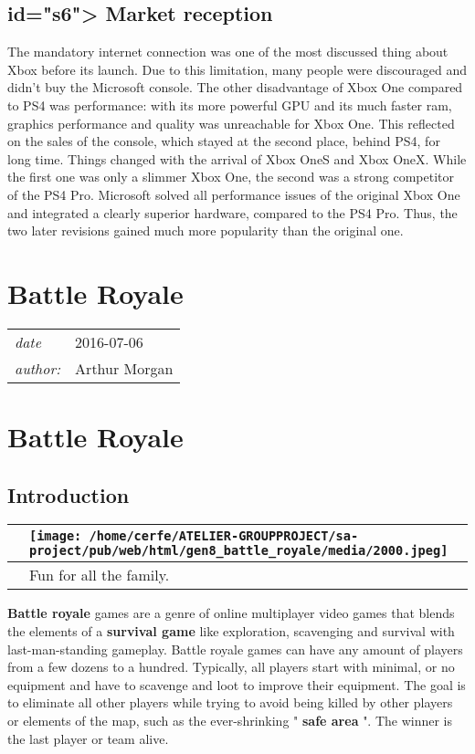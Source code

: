 \documentclass[a4paper,10pt]{book}
\newcommand{\pageHeader}[4]{
    \section{#1}
    \vspace{-0.3cm}
    \begin{table}[h!]
     \begin{tabular}{ll}
        \hline
        \textit{date} & #2 \\
        \textit{author: } & #3\\
        \hline
     \end{tabular}
    \end{table}
    \vspace{-0.3cm}
}
\begin{document}
 \subsection{ id="s6"> Market reception  }
  The mandatory internet connection was one of the most discussed thing about Xbox before its launch. Due to this limitation, many people were discouraged and didn't buy the Microsoft console. The other disadvantage of Xbox One compared to PS4 was performance: with its more powerful GPU and its much faster ram, graphics performance and quality was unreachable for Xbox One. This reflected on the sales of the console, which stayed at the second place, behind PS4, for long time.  
  Things changed with the arrival of Xbox OneS and Xbox OneX. While the first one was only a slimmer Xbox One, the second was a strong competitor of the PS4 Pro. Microsoft solved all performance issues of the original Xbox One and integrated a clearly superior hardware, compared to the PS4 Pro. Thus, the two later revisions gained much more popularity than the original one.  
 \newpage\pageHeader{Battle Royale}{2016-07-06}{Arthur Morgan}{The origins of the battle royale genre}
 \section{Battle Royale }
 \subsection{Introduction }
 \begin{longtable}{p{1mm}|l|}\hline
 
 & \texttt{[image: /home/cerfe/ATELIER-GROUPPROJECT/sa-project/pub/web/html/gen8\_battle\_royale/media/2000.jpeg]}
 \\\hline
 
 & Fun for all the family. 
 \\\hline
 \end{longtable}
 
 
 \textbf{Battle royale }  games are a genre of online multiplayer video games that blends the elements of a  \textbf{survival game }  like exploration, scavenging and survival with last-man-standing gameplay.
        Battle royale games can have any amount of players from a few dozens to a hundred. Typically, all players start with minimal, or no equipment and have to scavenge and loot to improve their equipment.
        The goal is to eliminate all other players while trying to avoid being killed by other players or elements of the map, such as the ever-shrinking " \textbf{safe area } ".
        The winner is the last player or team alive.
       
\end{document}
